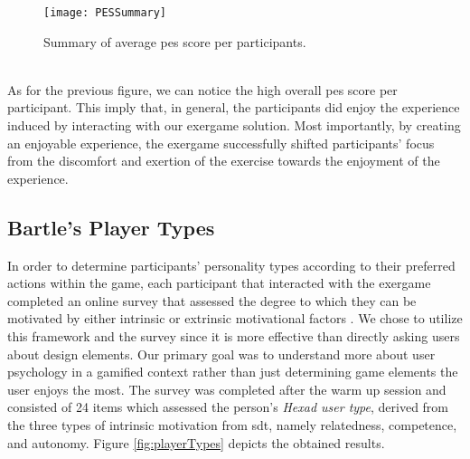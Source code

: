 \begin{figure}[h]
    \centering
    \texttt{[image: PESSummary]}
    \caption{Summary of average \acrshort{pes} score per participants.}
    \label{fig:pes}
\end{figure}\\
As for the previous figure, we can notice the high overall \acrshort{pes} score per participant. This imply that, in general, the participants did enjoy the experience induced by interacting with our exergame solution. Most importantly, by creating an enjoyable experience,  the exergame successfully shifted participants' focus from the discomfort and exertion of the exercise towards the enjoyment of the experience. 
\subsection{Bartle's Player Types}
In order to determine participants' personality types according to their preferred actions within the game, each participant that interacted with the exergame completed an online survey that assessed the degree to which they can be motivated by either intrinsic or extrinsic motivational factors \cite{tondello2016gamification}. We chose to utilize this framework and the survey since it is more effective than directly asking users about design elements. Our primary goal was to understand more about user psychology in a gamified context rather than just determining game elements the user enjoys the most.  The survey was completed after the warm up session and consisted of 24 items which assessed the person's \textit{Hexad user type}, derived from the three types of intrinsic motivation from \acrshort{sdt}, namely relatedness, competence, and autonomy. Figure \ref{fig:playerTypes} depicts the obtained results. \\
